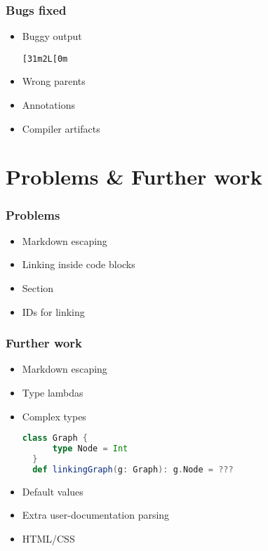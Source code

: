 \documentclass{beamer}
\begin{document}
\begin{frame}[fragile]
  \frametitle{Bugs fixed}
  \begin{itemize}
    \item Buggy output
    \begin{example}
      \texttt{[31m2L[0m}
    \end{example}\pause
    \item Wrong parents \pause
    \item Annotations \pause
    \item Compiler artifacts
  \end{itemize}
\end{frame}

\section{Problems \& Further work}

\begin{frame}
  \frametitle{Problems}
  \begin{itemize}
    \item Markdown escaping \pause
    \item Linking inside code blocks \pause
    \item Section \pause
    \item IDs for linking
  \end{itemize}
\end{frame}

\begin{frame}[fragile]
  \frametitle{Further work}
  \begin{itemize}
    \item Markdown escaping \pause
    \item Type lambdas \pause
    \item Complex types
\begin{lstlisting}[language=scala]
  class Graph {
      type Node = Int
  }
  def linkingGraph(g: Graph): g.Node = ???    
\end{lstlisting}\pause
    \item Default values \pause
    \item Extra user-documentation parsing \pause
    \item HTML/CSS
  \end{itemize}
\end{frame}
\end{document}
